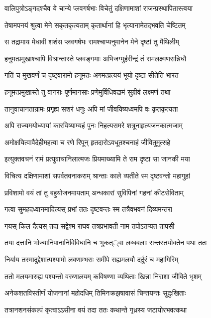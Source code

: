 \twolineshloka
{वालिपुत्रोऽङ्गदश्चैव ये चान्ये प्लवगर्षभाः}
{विचेतुं दक्षिणामाशां राजन्प्रस्थापितास्त्वया}


\twolineshloka
{तेषामपनयं श्रुत्वा मेने सकृतकृत्यताम्}
{कृतार्थानां हि भृत्यानामेतद्भवति चेष्टितम्}


\twolineshloka
{स तद्रामाय मेधावी शशंस प्लवगर्षभः}
{रामश्चाप्यनुमानेन मेने दृष्टां तु मैथिलीम्}


\twolineshloka
{हनुमत्प्रमुखाश्चापि विश्रान्तास्ते प्लवङ्गमाः}
{अभिजग्मुर्हरीन्द्रं तं रामलक्ष्मणसन्निधौ}


\twolineshloka
{गतिं च मुखवर्णं च दृष्ट्वारामो हनूमतः}
{अगमत्प्रत्ययं भूयो दृष्टा सीतेति भारत}


\twolineshloka
{हनूमत्प्रमुखास्ते तु वानराः पूर्णमानसाः}
{प्रणेमुर्विधिवद्रामं सुग्रीवं लक्ष्मणं तथा}


\twolineshloka
{तानुवाचानतान्रामः प्रगृह्य सशरं धनुः}
{अपि मां जीवयिष्यध्वमपि वः कृतकृत्यता}


\twolineshloka
{अपि राज्यमयोध्यायां कारयिष्याम्यहं पुनः}
{निहत्यसमरे शत्रूनाहृत्यजनकात्मजाम्}


\twolineshloka
{अमोक्षयित्वावैदेहीमहत्वा च रणे रिपून्}
{हृतदारोऽवधूतश्चनाहं जीवितुमुत्सहे}


\twolineshloka
{इत्युक्तवचनं रामं प्रत्युवाचानिलात्मजः}
{प्रियमाख्यामि ते राम दृष्टा सा जानकी मया}


\twolineshloka
{विचित्य दक्षिणामाशां सपर्वतवनाकराम्}
{श्रान्ताः काले व्यतीते स्म दृष्टवन्तो महागुहां}


\twolineshloka
{प्रविशामो वयं तां तु बहुयोजनमायताम्}
{अन्धकारां सुविपिनां गहनां कीटसेविताम्}


\twolineshloka
{गत्वा सुमहदध्वानमादित्यस् प्रभां ततः}
{दृष्टवन्तः स्म तत्रैवभवनं दिव्यमन्तरा}


\twolineshloka
{गयस् किल दैत्यस् तदा सद्वेश्म राघव}
{तत्रप्रभावती नाम तपोऽतप्यत तापसी}


\twolineshloka
{तया दत्तानि भोज्यानिपानानिविविधानि च}
{भुकत््वा लब्धबलाः सन्तस्तयोक्तेन पथा ततः}


\twolineshloka
{निर्याय तस्मादुद्देशात्पश्यामो लवणाम्भसः}
{समीपे सह्यमलयौ दर्दुरं च महागिरिम्}


\twolineshloka
{ततो मलयमारुह्य पश्यन्तो वरुणालयम्}
{कविषण्णा व्यथिताः खिन्ना निराशा जीविते भृशम्}


\twolineshloka
{अनेकशतविस्तीर्णं योजनानां महोदधिम्}
{तिमिनक्रझषावासं चिन्तयन्तः सुदुःखिताः}


\twolineshloka
{तत्रानशनसंकल्पं कृत्वाऽऽसीना वयं तदा}
{ततः कथान्ते गृध्रस्य जटायोरभवत्कथा}


